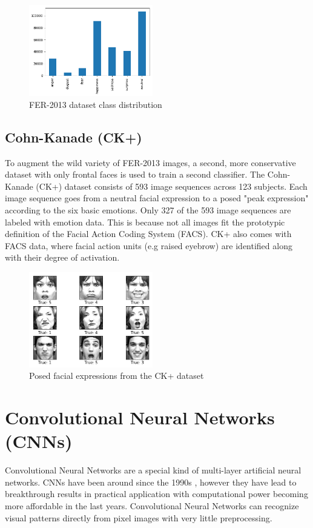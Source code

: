 \documentclass[twoside]{article}
\begin{document}
\begin{multicols}{2}
\begin{figure}[H]
	\includegraphics[width=0.48\textwidth]{ferplus_distribution}
	\caption{FER-2013 dataset class distribution}
\end{figure}

\subsection{Cohn-Kanade (CK+)}
To augment the wild variety of FER-2013 images, a second, more conservative dataset with only frontal faces is used to train a second classifier. The Cohn-Kanade (CK+) dataset consists of 593 image sequences across 123 subjects. Each image sequence goes from a neutral facial expression to a posed "peak expression" according to the six basic emotions. Only 327 of the 593 image sequences are labeled with emotion data. This is because not all images fit the prototypic definition of the Facial Action Coding System (FACS). CK+ also comes with FACS data, where facial action units (e.g raised eyebrow) are identified along with their degree of activation.

\begin{figure}[H]
	\includegraphics[width=0.48\textwidth]{ckplus_examples}
	\caption{Posed facial expressions from the CK+ dataset}
\end{figure}


\section{Convolutional Neural Networks (CNNs)}
Convolutional Neural Networks are a special kind of multi-layer artificial neural networks. CNNs have been around since the 1990s \cite{lecun98}, however they have lead to breakthrough results in practical application with computational power becoming more affordable in the last years. Convolutional Neural Networks can recognize visual patterns directly from pixel images with very little preprocessing. 


\end{multicols}
\end{document}
